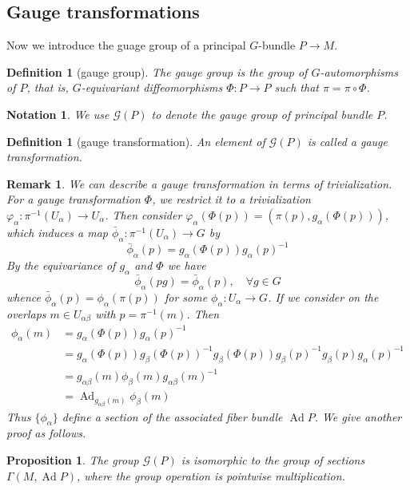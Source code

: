 \documentclass[11pt]{amsart}
\numberwithin{equation}{section}
\theoremstyle{plain}
\theoremstyle{plain}
\newtheorem{propsub}[thmsub]{Proposition}
\newtheorem{defnsub}[thmsub]{Definition}
\newtheorem{remksub}[thmsub]{Remark}
\newtheorem{notasub}[thmsub]{Notation}
\numberwithin{equation}{section}
\begin{document}
\subsection{Gauge transformations}
Now we introduce the guage group of a principal $G$-bundle $P\to M$.
\begin{defnsub}[gauge group]
The gauge group is the group of $G$-automorphisms of $P$, that is, $G$-equivariant diffeomorphisms $\Phi:P\to P$ such that $\pi=\pi\circ\Phi$.
\end{defnsub}
\begin{notasub}\normalfont
We use $\mathscr{G}(P)$ to denote the gauge group of principal bundle $P$.
\end{notasub}
\begin{defnsub}[gauge transformation]
 An element of $\mathscr{G}(P)$ is called a gauge transformation.
\end{defnsub}
\begin{remksub}\normalfont
We can describe a gauge transformation in terms of trivialization. For a gauge transformation $\Phi$, we restrict it to a trivialization $\varphi_{\alpha}:\pi^{-1}(U_{\alpha})\to U_{\alpha}$. Then consider $\varphi_{\alpha}(\Phi(p))=(\pi(p),g_{\alpha}(\Phi(p)))$, which induces a map $\bar{\phi}_{\alpha}:\pi^{-1}(U_{\alpha})\to G$ by
$$
\bar{\phi}_{\alpha}(p)=g_{\alpha}(\Phi(p))g_{\alpha}(p)^{-1}
$$
By the equivariance of $g_{\alpha}$ and $\Phi$ we have 
$$
\bar{\phi}_{\alpha}(pg)=\bar{\phi}_{\alpha}(p),\quad\forall g\in G
$$
whence $\bar{\phi}_{\alpha}(p)=\phi_{\alpha}(\pi(p))$ for some $\phi_{\alpha}:U_{\alpha}\to G$. If we consider on the overlaps $m\in U_{\alpha\beta}$ with $p=\pi^{-1}(m)$. Then
$$
\begin{aligned}
\phi_{\alpha}(m) &=g_{\alpha}(\Phi(p)) g_{\alpha}(p)^{-1} \\
&=g_{\alpha}(\Phi(p)) g_{\beta}(\Phi(p))^{-1} g_{\beta}(\Phi(p)) g_{\beta}(p)^{-1} g_{\beta}(p) g_{\alpha}(p)^{-1} \\
&=g_{\alpha \beta}(m) \phi_{\beta}(m) g_{\alpha \beta}(m)^{-1} \\
&=\operatorname{Ad}_{g_{\alpha \beta}(m)} \phi_{\beta}(m)
\end{aligned}
$$
Thus $\{\phi_{\alpha}\}$ define a section of the associated fiber bundle $\operatorname{Ad}P$. We give another proof as follows.
\end{remksub}
\begin{propsub}
The group $\mathscr{G}(P)$ is isomorphic to the group of sections $\Gamma(M,\operatorname{Ad}P)$, where the group operation is pointwise multiplication.
\end{propsub}
\end{document}
